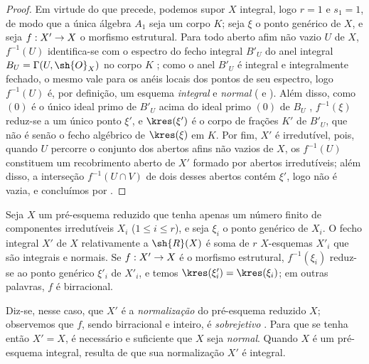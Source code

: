 \documentclass[oneside,10pt]{amsart}
\makeatletter
\renewcommand{\leq}{\leqslant}
\newcommand{\ega@arrow}[2]{\mathchoice{#1}{#2}{#2}{#2}}
\renewcommand{\to}{\ega@arrow{\longrightarrow}{\rightarrow}}
\let\EGAOriginalLabel\label
\renewcommand{\label}[1]{\phantomsection\EGAOriginalLabel{#1}}
\makeatother
\begin{document}
\begin{proof}
Em virtude do que precede, podemos supor $X$ integral, logo $r=1$ e $s_1=1$, de modo que a única álgebra $A_1$ seja um corpo $K$;
seja $\xi$ o ponto genérico de $X$, e seja $f:X'\to X$ o morfismo estrutural.
Para todo aberto afim não vazio $U$ de $X$, $f^{-1}(U)$ identifica-se com o espectro do fecho integral $B'_U$ do anel integral $B_U=\Gamma(U,\sh{O}_X)$ no corpo $K$ ;
como o anel $B'_U$ é integral e integralmente fechado, o mesmo vale para os anéis locais dos pontos de seu espectro, logo $f^{-1}(U)$ é, por definição, um esquema \emph{integral} e \emph{normal} ( e ).
Além disso, como $(0)$ é o único ideal primo de $B'_U$ acima do ideal primo $(0)$ de $B_U$ \cite[t.~I, p.~259]{I-13}, $f^{-1}(\xi)$ reduz-se a um único ponto $\xi'$, e $\kres(\xi')$ é o corpo de frações $K'$ de $B'_U$, que não é senão o fecho algébrico de $\kres(\xi)$ em $K$.
Por fim, $X'$ é irredutível, pois, quando $U$ percorre o conjunto dos abertos afins não vazios de $X$, os $f^{-1}(U)$ constituem um recobrimento aberto de $X'$ formado por abertos irredutíveis;
além disso, a interseção $f^{-1}(U\cap V)$ de dois desses abertos contém $\xi'$, logo não é vazia, e concluímos por .
\end{proof}

\begin{corollary}[6.3.8]
\label{II.6.3.8}
Seja $X$ um pré-esquema reduzido que tenha apenas um número finito de componentes irredutíveis $X_i$ ($1\leq i\leq r$), e seja $\xi_i$ o ponto genérico de $X_i$.
O fecho integral $X'$ de $X$ relativamente a $\sh{R}(X)$ é soma de $r$ $X$-esquemas $X'_i$ que são integrais e normais.
Se $f:X'\to X$ é o morfismo estrutural, $f^{-1}(\xi_i)$ reduz-se ao ponto genérico $\xi'_i$ de $X'_i$, e temos $\kres(\xi'_i)=\kres(\xi_i)$; em outras palavras, $f$ é birracional.
\end{corollary}

Diz-se, nesse caso, que $X'$ é a \emph{normalização} do pré-esquema reduzido $X$;
observemos que $f$, sendo birracional e inteiro, é \emph{sobrejetivo} .
Para que se tenha então $X'=X$, é necessário e suficiente que $X$ seja \emph{normal}.
Quando $X$ é um pré-esquema integral, resulta de  que sua normalização $X'$ é integral.
\end{document}

